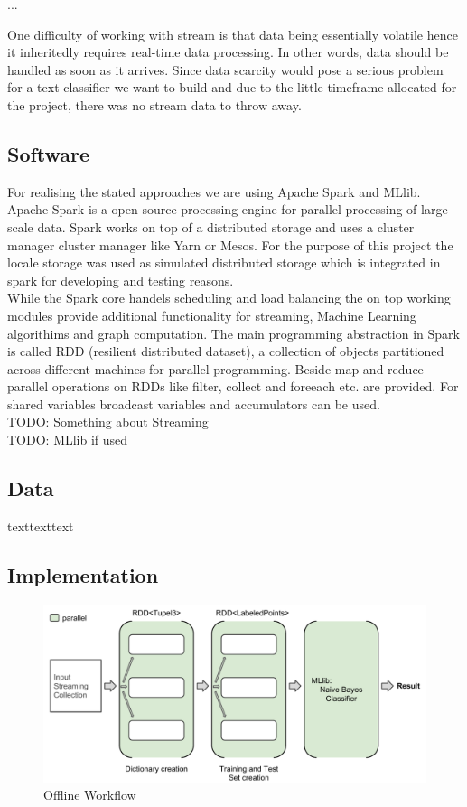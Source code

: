 \documentclass[12pt]{article}
\begin{document}
...


One difficulty of working with stream is that data being essentially volatile hence it inheritedly requires real-time data processing. In other words,  data should be handled as soon as it arrives. Since data scarcity would pose a serious problem for a text classifier we want to build and due to the little timeframe allocated for the project, there was no stream data to throw away. 

\subsection{Software}
For realising the stated approaches we are using Apache Spark and MLlib. Apache Spark is a open source processing engine for parallel processing of large scale data. Spark works on top of a distributed storage and uses a cluster manager cluster manager like Yarn or Mesos. For the purpose of this project the locale storage was used as simulated distributed storage which is integrated in spark for developing and testing reasons.  \\
While the Spark core handels scheduling and load balancing the on top working modules provide additional functionality for streaming, Machine Learning  algorithims and graph computation. The main programming abstraction in Spark is called RDD (resilient distributed dataset), a collection of objects partitioned across different machines for parallel programming. Beside map and reduce parallel operations on RDDs like filter, collect and foreeach etc. are provided. For shared variables broadcast variables and  accumulators can be used.
\\ 
TODO: Something about Streaming
\\
TODO: MLlib if used


\subsection{Data}
texttexttext

\newpage
\subsection{Implementation}

\begin{figure}[htbp]
  \centering
  \includegraphics[scale=0.56]{VisualisationOfflineWorkflow.pdf}
  \caption{Offline Workflow}
\end{figure}
\end{document}
